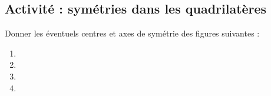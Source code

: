 
\subsection*{Activité : symétries dans les quadrilatères}

Donner les éventuels centres et axes de symétrie des figures suivantes :
\begin{multicols}{2}
\begin{enumerate}
    \item

    \item

    \item

    \item

\end{enumerate}
\end{multicols}
